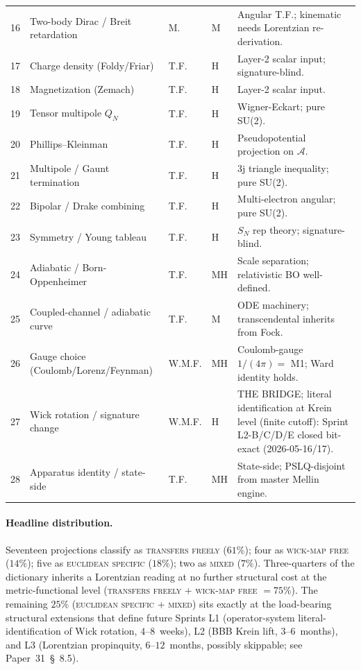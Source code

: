 \documentclass[11pt]{article}
\begin{document}
\begin{table}[h]
\begin{tabular}{p{0.4cm} p{4.3cm} p{0.8cm} p{0.5cm} p{8cm}}
16 & Two-body Dirac / Breit retardation & M. & M & Angular T.F.; kinematic needs Lorentzian re-derivation. \\
17 & Charge density (Foldy/Friar) & T.F. & H & Layer-2 scalar input; signature-blind. \\
18 & Magnetization (Zemach) & T.F. & H & Layer-2 scalar input. \\
19 & Tensor multipole $Q_N$ & T.F. & H & Wigner-Eckart; pure SU(2). \\
20 & Phillips--Kleinman & T.F. & H & Pseudopotential projection on $\mathcal{A}$. \\
21 & Multipole / Gaunt termination & T.F. & H & 3j triangle inequality; pure SU(2). \\
22 & Bipolar / Drake combining & T.F. & H & Multi-electron angular; pure SU(2). \\
23 & Symmetry / Young tableau & T.F. & H & $S_N$ rep theory; signature-blind. \\
24 & Adiabatic / Born-Oppenheimer & T.F. & MH & Scale separation; relativistic BO well-defined. \\
25 & Coupled-channel / adiabatic curve & T.F. & M & ODE machinery; transcendental inherits from Fock. \\
26 & Gauge choice (Coulomb/Lorenz/Feynman) & W.M.F. & MH & Coulomb-gauge $1/(4\pi) = $ M1; Ward identity holds. \\
27 & Wick rotation / signature change & W.M.F. & H & THE BRIDGE; literal identification at Krein level (finite cutoff): Sprint L2-B/C/D/E closed bit-exact (2026-05-16/17). \\
28 & Apparatus identity / state-side & T.F. & MH & State-side; PSLQ-disjoint from master Mellin engine. \\
\bottomrule
\end{tabular}
\end{table}

\paragraph{Headline distribution.}
Seventeen projections classify as \textsc{transfers freely}
($61\%$); four as \textsc{wick-map free} ($14\%$); five as
\textsc{euclidean specific} ($18\%$); two as \textsc{mixed} ($7\%$).
Three-quarters of the dictionary inherits a Lorentzian reading at no
further structural cost at the metric-functional level
(\textsc{transfers freely} + \textsc{wick-map free} $= 75\%$).  The
remaining $25\%$ (\textsc{euclidean specific} + \textsc{mixed}) sits
exactly at the load-bearing structural extensions that define future
Sprints L1 (operator-system literal-identification of Wick rotation,
$4$--$8$~weeks), L2 (BBB Krein lift, $3$--$6$~months), and L3
(Lorentzian propinquity, $6$--$12$~months, possibly skippable; see
Paper~31~\S~8.5).
\end{document}
